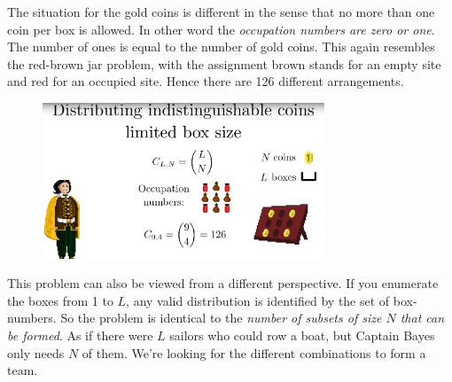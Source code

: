 \documentclass[12pt, a4paper]{scrartcl}
\begin{document}
The situation for the gold coins is different in the sense that no more than one coin per box is allowed. In other word the \textit{occupation numbers are zero or one}. The number of ones is equal to the number of gold coins. %
 This again resembles the red-brown jar problem, with the assignment brown stands for an empty site and red for an occupied site. Hence there are 126 different arrangements.
 \begin{figure}[H]
	\centering
	\includegraphics[width=0.75\textwidth]{4_13.png}
\end{figure}
This problem can also be viewed from a different perspective. If you enumerate the boxes from 1 to $L$, any valid distribution is identified by the set of box-numbers. So the problem is identical to the \textit{number of subsets of size $N$ that can be formed}. 
As if there were $L$ sailors who could row a boat, but Captain Bayes only needs $N$ of them. We're looking for the different combinations to form a team. \\
\end{document}
